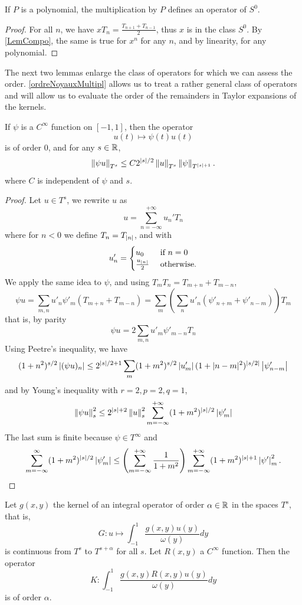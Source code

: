 \documentclass[a4paper]{article}
\begin{document}
\begin{Lem}
	\label{lem:multPolyOrdre0}
	If $P$ is a polynomial, the multiplication by $P$ defines an operator of $S^0$. 
\end{Lem}
\begin{proof}
	For all $n$, we have $xT_n = \frac{T_{n+1} + T_{n-1}}{2}$, thus $x$ is in the class $S^0$. By \autoref{LemCompo}, the same is true for $x^n$ for any $n$, and by linearity, for any polynomial. 
\end{proof}
The next two lemmas enlarge the class of operators for which we can assess the order. \autoref{ordreNoyauxMultipl} allows us to treat a rather general class of operators and will allow us to evaluate the order of the remainders in Taylor expansions of the kernels. 
\begin{Lem}
	\label{lem:multByPsiOrdre0}
	If $\psi$ is a $C^{\infty}$ function on $[-1,1]$, then the operator
	\[ u(t) \mapsto \psi(t) u(t)\]
	is of order $0$, and for any $s \in \mathbb{R}$, 
	\[ \left\|\psi u\right\|_{T^s} \leq C2^{\left\lvert s \right\rvert/2}\left\|u\right\|_{T^s} \left\|\psi\right\|_{T^{\left\lvert s \right\rvert+1}}.\]
	where $C$ is independent of $\psi$ and $s$. 
\end{Lem}
\begin{proof}
	Let $u \in T^s$, we rewrite $u$ as 
	\[ u = \sum_{n = -\infty}^{+ \infty}u_n'T_n\]
	where for $n< 0$ we define $T_{n} = T_{\left\lvert n \right\rvert}$, and with 
	\[u_n' = \begin{cases}
	u_0 & \text{ if } n = 0\\
	\frac{u_{\left\lvert n \right\rvert}}{2} & \text{ otherwise.}
	\end{cases}\]
	We apply the same idea to $\psi$, and using $T_m T_n = T_{m+n} + T_{m-n}$, 
	\[\psi u = \sum_{m,n} u'_n \psi'_m (T_{m+n} + T_{m-n}) = \sum_{m} \left(\sum_{n}u'_n(\psi'_{n + m} + \psi'_{n - m})\right) T_m\]
	that is, by parity
	\[\psi u = 2\sum_{m,n} u'_m \psi'_{m-n} T_{n}\]
	Using Peetre's inequality, we have 
	\[(1 + n^2)^{s/2}\left\lvert (\psi u)_n \right\rvert \leq 2^{\left\lvert s \right\rvert/2+1}\sum_{m}(1 + m^2)^{s/2} \left\lvert u'_m \right\rvert  (1 + |n-m|^2)^{\left\lvert s/2 \right\rvert} \left\lvert \psi'_{n-m} \right\rvert \]
	and by Young's inequality with $r = 2, p = 2, q = 1$, 
	\[\left\|\psi u\right\|_s^2 \leq 2^{\left\lvert s \right\rvert+2}\left\|u\right\|_s^2 \sum_{m=-\infty}^{+\infty} (1 + m^2)^{\left\lvert s \right\rvert/2}\left\lvert \psi'_m \right\rvert \]		
	The last sum is finite because $\psi \in T^{\infty}$ and
	\[\sum_{m=-\infty}^{\infty}(1 + m^2)^{\left\lvert s \right\rvert/2} \left\lvert \psi'_m \right\rvert \leq \left(\sum_{m = -\infty}^{+ \infty} \frac{1}{1 + m^2} \right)\sum_{m=-\infty}^{+\infty} (1 + m^2)^{\left\lvert s \right\rvert+1}\left\lvert \psi' \right\rvert_m^2.\]
\end{proof}
\begin{Lem}
	\label{ordreNoyauxMultipl}
	Let $g(x,y)$ the kernel of an integral operator of order $\alpha \in \mathbb{R}$ in the spaces $T^s$, that is,
	\[G : u \mapsto \int_{-1}^{1} \frac{g(x,y) u(y)}{\omega(y)}dy\]
	is continuous from $T^s$ to $T^{s + \alpha}$ for all $s$. Let $R(x,y)$ a $C^{\infty}$ function. Then the operator 
	\[K : \int_{-1}^{1} \frac{g(x,y) R(x,y) u(y)}{\omega(y)}dy\]
	is of order $\alpha$. 
\end{Lem}
\end{document}
